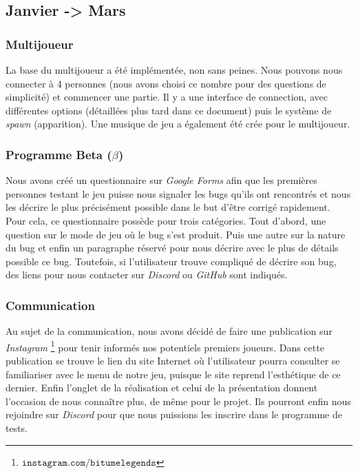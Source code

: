 \documentclass[a4paper,12pt]{article}
\begin{document}
        \subsection{Janvier -> Mars}
            \subsubsection{Multijoueur}
                La base du multijoueur a été implémentée, non sans peines. 
                Nous pouvons nous connecter à 4 personnes (nous avons choisi ce nombre pour des questions 
                de simplicité) et commencer une partie. Il y a une interface de connection, avec différentes 
                options (détaillées plus tard dans ce document) puis le système de \textit{spawn} (apparition).
                Une musique de jeu a également été crée pour le multijoueur.
  
            \subsubsection{Programme Beta (\(\beta\))}
                Nous avons créé un questionnaire sur \textsl{Google Forms} afin que les premières personnes testant
                le jeu puisse nous signaler les bugs qu'ils ont rencontrés et nous les décrire le plus 
                précisément possible dans le but d'être corrigé rapidement. Pour cela, ce questionnaire 
                possède pour trois catégories. Tout d'abord, une question sur le mode de jeu où le bug 
                s'est produit. Puis une autre sur la nature du bug et enfin un paragraphe réservé
                pour nous décrire avec le plus de détails possible ce bug. Toutefois, si l'utilisateur
                trouve compliqué de décrire son bug, des liens pour nous contacter sur \textsl{Discord} 
                ou \textsl{GitHub} sont indiqués.
        
            \subsubsection{Communication}
                Au sujet de la communication, nous avons décidé de faire une publication sur \textsl{Instagram}
                \footnote{\(\mathtt{instagram.com/bitumelegends}\)}
                pour tenir informés nos potentiels premiers joueurs. Dans cette publication se trouve le lien 
                du site Internet où l'utilisateur pourra consulter se familiariser avec le menu de notre
                jeu, puisque le site reprend l'esthétique de ce dernier. Enfin l'onglet de la réalisation
                et celui de la présentation donnent l'occasion de nous connaître plus, de même pour le projet.
                Ils pourront enfin nous rejoindre sur \textsl{Discord} pour que nous puissions les inscrire dans le
                programme de tests.
        
\end{document}
